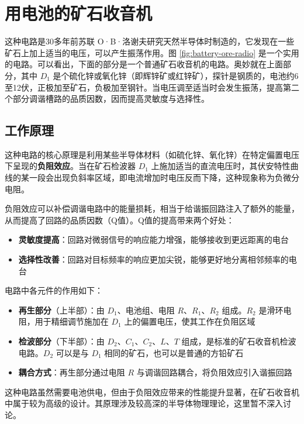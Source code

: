 \documentclass[12pt,UTF8]{ctexbook}
\begin{document}
\section{用电池的矿石收音机}

这种电路是30多年前苏联 O·B·洛谢夫研究天然半导体时制造的，它发现在一些矿石上加上适当的电压，可以产生振荡作用。图 \ref{fig:battery-ore-radio} 是一个实用的电路。可以看出，下面的部分是一个普通矿石收音机的电路。奥妙就在上面部分，其中 $D_1$ 是个硫化锌或氧化锌（即辉锌矿或红锌矿），探针是钢质的，电池约6至12伏，正极加至矿石，负极加至钢针。当电压调至适当时会发生振荡，提高第二个部分调谐槽路的品质因数，因而提高灵敏度与选择性。

\subsection{工作原理}

这种电路的核心原理是利用某些半导体材料（如硫化锌、氧化锌）在特定偏置电压下呈现的\textbf{负阻效应}。当在矿石检波器 $D_1$ 上施加适当的直流电压时，其伏安特性曲线的某一段会出现负斜率区域，即电流增加时电压反而下降，这种现象称为负微分电阻。

负阻效应可以补偿调谐电路中的能量损耗，相当于给谐振回路注入了额外的能量，从而提高了回路的品质因数（Q值）。Q值的提高带来两个好处：

\begin{itemize}
	\item \textbf{灵敏度提高}：回路对微弱信号的响应能力增强，能够接收到更远距离的电台
	\item \textbf{选择性改善}：回路对目标频率的响应更加尖锐，能够更好地分离相邻频率的电台
\end{itemize}

电路中各元件的作用如下：

\begin{itemize}
	\item \textbf{再生部分}（上半部）：由 $D_1$、电池组、电阻 $R$、$R_1$、$R_2$ 组成。$R_2$ 是滑环电阻，用于精细调节施加在 $D_1$ 上的偏置电压，使其工作在负阻区域
	\item \textbf{检波部分}（下半部）：由 $D_2$、$C_1$、$C_2$、$L$、$T$ 组成，是标准的矿石收音机检波电路。$D_2$ 可以是与 $D_1$ 相同的矿石，也可以是普通的方铅矿石
	\item \textbf{耦合方式}：再生部分通过电阻 $R$ 与调谐回路耦合，将负阻效应引入谐振回路
\end{itemize}

这种电路虽然需要电池供电，但由于负阻效应带来的性能提升显著，在矿石收音机中属于较为高级的设计。其原理涉及较高深的半导体物理理论，这里暂不深入讨论。
\end{document}

